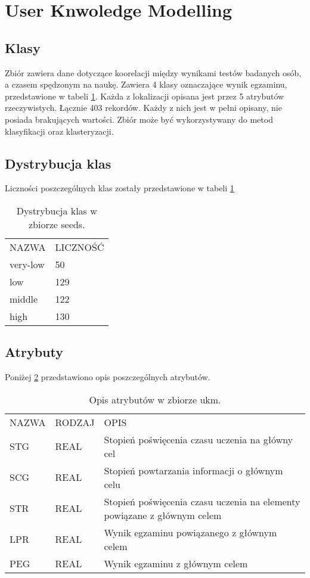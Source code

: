 \section{User Knwoledge Modelling}
	\subsection{Klasy}
Zbiór zawiera dane dotyczące koorelacji między wynikami testów badanych osób, a czasem spędzonym na naukę. Zawiera 4 klasy oznaczające wynik egzaminu, przedstawione w tabeli \ref{dist-ukm}. Każda z lokalizacji opisana jest przez 5 atrybutów rzeczywistych.
Łącznie 403 rekordów. Każdy z nich jest w pełni opisany, nie posiada brakujących wartości. Zbiór może być wykorzystywany do metod klasyfikacji oraz klasteryzacji.
	\subsection{Dystrybucja klas}
		Liczności poszczególnych klas zostały przedstawione w tabeli \ref{dist-ukm}
\begin{table}[H]
\centering
\caption{Dystrybucja klas w zbiorze seeds.}
\label{dist-ukm}
\begin{tabular}{ll}
NAZWA    & LICZNOŚĆ \\
very-low     & 50       \\
low     & 129       \\
middle & 122 \\
high & 130      
\end{tabular}
\end{table}
	\subsection{Atrybuty}
		Poniżej \ref{attr-ukm} przedstawiono opis poszczególnych atrybutów.
\begin{table}[H]
\centering
\caption{Opis atrybutów w zbiorze ukm.}
\label{attr-ukm}
\begin{tabular}{lll}
NAZWA    	& RODZAJ & OPIS \\
STG & REAL & Stopień poświęcenia czasu uczenia na główny cel\\
SCG & REAL & Stopień powtarzania informacji o głównym celu\\
STR & REAL & Stopień poświęcenia czasu uczenia na elementy powiązane z głównym celem\\
LPR & REAL & Wynik egzaminu powiązanego z głównym celem \\
PEG & REAL & Wynik egzaminu z głównym celem
\end{tabular}
\end{table}	

